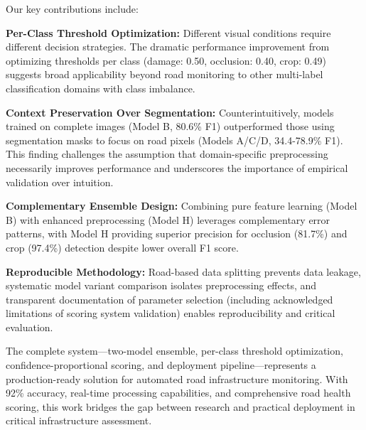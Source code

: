 \documentclass[12pt]{article}
\begin{document}
Our key contributions include:

\textbf{Per-Class Threshold Optimization:} Different visual conditions require different decision strategies. The dramatic performance improvement from optimizing thresholds per class (damage: 0.50, occlusion: 0.40, crop: 0.49) suggests broad applicability beyond road monitoring to other multi-label classification domains with class imbalance.

\textbf{Context Preservation Over Segmentation:} Counterintuitively, models trained on complete images (Model B, 80.6\% F1) outperformed those using segmentation masks to focus on road pixels (Models A/C/D, 34.4-78.9\% F1). This finding challenges the assumption that domain-specific preprocessing necessarily improves performance and underscores the importance of empirical validation over intuition.

\textbf{Complementary Ensemble Design:} Combining pure feature learning (Model B) with enhanced preprocessing (Model H) leverages complementary error patterns, with Model H providing superior precision for occlusion (81.7\%) and crop (97.4\%) detection despite lower overall F1 score.

\textbf{Reproducible Methodology:} Road-based data splitting prevents data leakage, systematic model variant comparison isolates preprocessing effects, and transparent documentation of parameter selection (including acknowledged limitations of scoring system validation) enables reproducibility and critical evaluation.

The complete system—two-model ensemble, per-class threshold optimization, confidence-proportional scoring, and deployment pipeline—represents a production-ready solution for automated road infrastructure monitoring. With 92\% accuracy, real-time processing capabilities, and comprehensive road health scoring, this work bridges the gap between research and practical deployment in critical infrastructure assessment.



\end{document}
